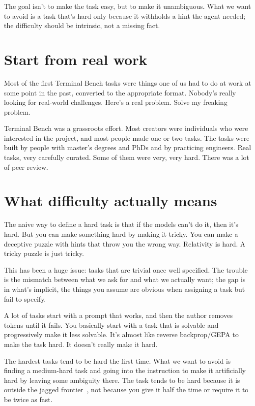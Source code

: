 \documentclass[11pt]{article}
\begin{document}
The goal isn't to make the task easy, but to make it unambiguous. What we want to avoid is a task that's hard only because it withholds a hint the agent needed; the difficulty should be intrinsic, not a missing fact.

\section{Start from real work}

Most of the first Terminal Bench tasks were things one of us had to do at work at some point in the past, converted to the appropriate format. Nobody's really looking for real-world challenges. Here's a real problem. Solve my freaking problem.

Terminal Bench was a grassroots effort. Most creators were individuals who were interested in the project, and most people made one or two tasks. The tasks were built by people with master's degrees and PhDs and by practicing engineers. Real tasks, very carefully curated. Some of them were very, very hard. There was a lot of peer review.

\section{What difficulty actually means}

The naive way to define a hard task is that if the models can't do it, then it's hard. But you can make something hard by making it tricky. You can make a deceptive puzzle with hints that throw you the wrong way. Relativity is hard. A tricky puzzle is just tricky.

This has been a huge issue: tasks that are trivial once well specified. The trouble is the mismatch between what we ask for and what we actually want; the gap is in what's implicit, the things you assume are obvious when assigning a task but fail to specify.

A lot of tasks start with a prompt that works, and then the author removes tokens until it fails. You basically start with a task that is solvable and progressively make it less solvable. It's almost like reverse backprop/GEPA to make the task hard. It doesn't really make it hard.

The hardest tasks tend to be hard the first time. What we want to avoid is finding a medium-hard task and going into the instruction to make it artificially hard by leaving some ambiguity there. The task tends to be hard because it is outside the jagged frontier~\citep{jagged-frontier}, not because you give it half the time or require it to be twice as fast.
\end{document}

